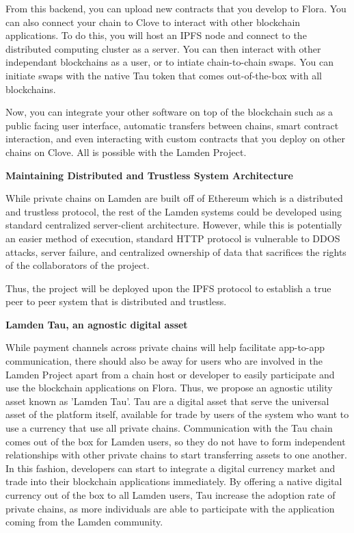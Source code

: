 \documentclass{%
	article}
\begin{document}
From this backend, you can upload new contracts that you develop to Flora. You can also connect your chain to Clove to interact with other blockchain applications. To do this, you will host an IPFS node and connect to the distributed computing cluster as a server. You can then interact with other independant blockchains as a user, or to intiate chain-to-chain swaps. You can initiate swaps with the native Tau token that comes out-of-the-box with all blockchains.

Now, you can integrate your other software on top of the blockchain such as a public facing user interface, automatic transfers between chains, smart contract interaction, and even interacting with custom contracts that you deploy on other chains on Clove. All is possible with the Lamden Project.

\begin{center}
\textbf{Maintaining Distributed and Trustless System Architecture}
\end{center}

While private chains on Lamden are built off of Ethereum which is a distributed and trustless protocol, the rest of the Lamden systems could be developed using standard centralized server-client architecture. However, while this is potentially an easier method of execution, standard HTTP protocol is vulnerable to DDOS attacks, server failure, and centralized ownership of data that sacrifices the rights of the collaborators of the project\cite{symantecreport}.

Thus, the project will be deployed upon the IPFS protocol to establish a true peer to peer system that is distributed and trustless.

\begin{center}
\textbf{Lamden Tau, an agnostic digital asset}
\end{center}

While payment channels across private chains will help facilitate app-to-app communication, there should also be away for users who are involved in the Lamden Project apart from a chain host or developer to easily participate and use the blockchain applications on Flora. Thus, we propose an agnostic utility asset known as 'Lamden Tau'. Tau are a digital asset that serve the universal asset of the platform itself, available for trade by users of the system who want to use a currency that use all private chains. Communication with the Tau chain comes out of the box for Lamden users, so they do not have to form independent relationships with other private chains to start transferring assets to one another. In this fashion, developers can start to integrate a digital currency market and trade into their blockchain applications immediately. By offering a native digital currency out of the box to all Lamden users, Tau increase the adoption rate of private chains, as more individuals are able to participate with the application coming from the Lamden community.
\end{document}
